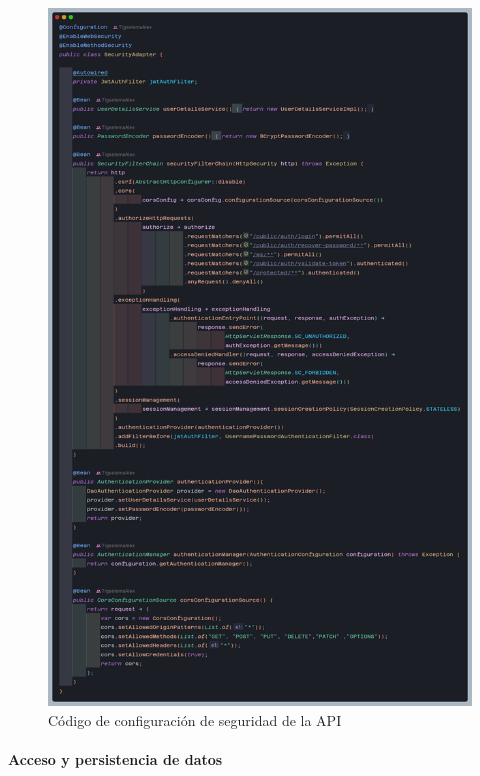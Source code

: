 \begin{figure}[H]
    \centering
    \includegraphics[width=1\textwidth]{resources/images/security}
    \caption{Código de configuración de seguridad de la API}
    \label{fig:security}
\end{figure}

\paragraph{Acceso y persistencia de datos}

